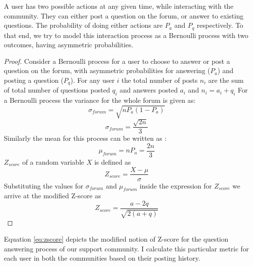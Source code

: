  A user has two possible actions at any given time, while interacting with the community. They can either post a question on the forum, or answer to existing questions. The probability of doing either actions are $P_a$ and $P_q$ respectively. To that end, we try to model this interaction process as a Bernoulli process with two outcomes, having asymmetric probabilities. 
 
\begin{proof}
   
    Consider a Bernoulli process for a user to choose to answer or post a question on the forum, with asymmetric probabilities for answering ($P_a$) and posting a question ($P_q$). 
    For any user $i$ the total number of posts $n_i$ are the sum of total number of questions posted $q_i$ and answers posted $a_i$ and $n_i = a_i + q_i$
    For a Bernoulli process the variance for the whole forum is given as: 
     $$\sigma_{forum} = \sqrt{nP_a(1-P_a)}$$     $$\sigma_{forum} = \frac{\sqrt{2n}}{3}$$
    Similarly the mean for this process can be written as : 
    $$ \mu_{forum} = nP_a = \frac{2n}{3} $$
    $Z_{score}$ of a random variable $X$ is defined as 
    $$Z_{score} = \frac{X - \mu}{\sigma}$$
    Substituting the values for $\sigma_{forum}$ and  $\mu_{forum}$ inside the expression for $Z_{score}$ we arrive at the modified Z-score as 
    \begin{equation}
        Z_{score} = \frac{a-2q}{\sqrt{2(a+q)}}
    \label{eq:zscore}
    \end{equation}    
\end{proof}
Equation \ref{eq:zscore} depicts the modified notion of Z-score for the question answering process of our support community. I calculate this particular metric for each user in both the communities based on their posting history. 
